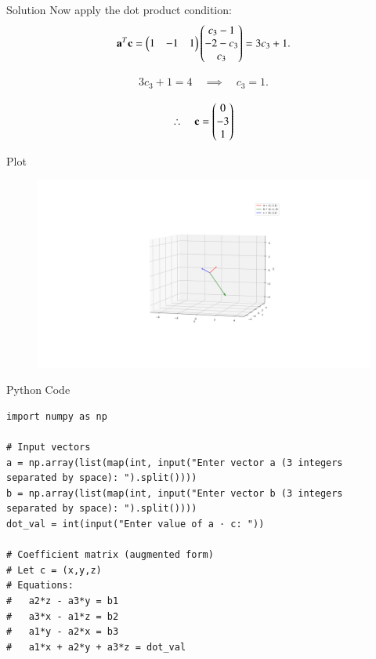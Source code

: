 \documentclass{beamer}
\begin{document}
\begin{frame}{Solution}
    Now apply the dot product condition:
\begin{align}
\mathbf{a}^T\mathbf{c} = \begin{pmatrix}1 & -1 & 1\end{pmatrix}\begin{pmatrix}c_3-1 \\ -2-c_3 \\ c_3\end{pmatrix} = 3c_3+1.
\end{align}

\begin{align}
3c_3+1=4 \quad \implies \quad c_3=1.
\end{align}

\begin{align}
\therefore \quad \mathbf{c} = \begin{pmatrix}0 \\ -3 \\ 1\end{pmatrix}
\end{align}

\end{frame}

\begin{frame}{Plot}
    \begin{figure}
        \centering
        \includegraphics[width=1\columnwidth]{figs/plot4.png}
        \caption{}
        \label{fig:placeholder}
    \end{figure}
\end{frame}

\begin{frame}[fragile]{Python Code}
    \begin{verbatim}
import numpy as np

# Input vectors
a = np.array(list(map(int, input("Enter vector a (3 integers 
separated by space): ").split())))
b = np.array(list(map(int, input("Enter vector b (3 integers 
separated by space): ").split())))
dot_val = int(input("Enter value of a · c: "))

# Coefficient matrix (augmented form)
# Let c = (x,y,z)
# Equations:
#   a2*z - a3*y = b1
#   a3*x - a1*z = b2
#   a1*y - a2*x = b3
#   a1*x + a2*y + a3*z = dot_val
    \end{verbatim}
\end{frame}
\end{document}
